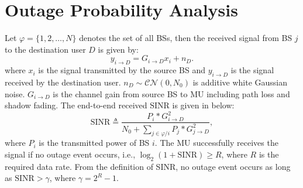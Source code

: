  \section{Outage Probability Analysis}
 \label{4:OutageProb}
 \par Let $\varphi = \{1, 2, \dots, N\}$ denotes the set of all BSs, then the received signal from BS $j$ to the destination user $D$ is given by:
 \begin{equation}
 y_{i\to D} = G_{i\to D}x_{i}+n_{D}.
 \end{equation}
 where $x_{i}$ is the signal transmitted by the source BS and $y_{i\to D}$ is the signal received by the destination user. $n_{D}\sim \mathcal{CN}(0,N_{0})$ is additive white Gaussian noise. $G_{i\to D}$ is the channel gain from source BS to MU including path loss and shadow fading. The end-to-end received $\text{SINR}$ is given in below:
 \begin{equation}
 \text{SINR} \triangleq \frac{P_{i}*G_{i\to D}^{2}}{N_{0}+\sum_{j\in \varphi/i}P_{j}*G_{j\to D}^2},
 \end{equation}
 where $P_{i}$ is the transmitted power of BS $i$. The MU successfully receives the signal if no outage event occurs, i.e., $\log_{2}(1+\text{SINR})\ge R$, where $R$ is the required data rate. From the definition of SINR, no outage event occurs as long as $\text{SINR} > \gamma$, where $\gamma = 2^{R}-1$.

